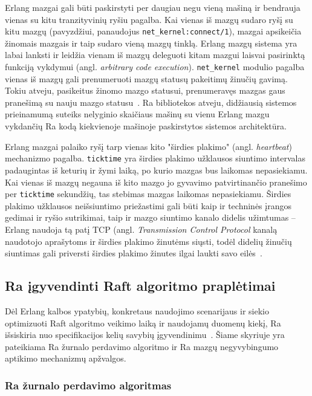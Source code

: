 \documentclass{VUMIFPSkursinis}
\begin{document}
Erlang mazgai gali būti paskirstyti per daugiau negu vieną mašiną ir bendrauja vienas su kitu tranzityvinių ryšiu pagalba. Kai vienas iš mazgų sudaro ryšį su kitu mazgų (pavyzdžiui, panaudojus \texttt{net\_kernel:connect/1}), mazgai apsikeičia žinomais mazgais ir taip sudaro vieną mazgų tinklą. Erlang mazgų sistema yra labai lanksti ir leidžia vienam iš mazgų deleguoti kitam mazgui laisvai pasirinktą funkciją vykdymui (angl. \textit{arbitrary code execution}). \texttt{net\_kernel} modulio pagalba vienas iš mazgų gali prenumeruoti mazgų statusų pakeitimų žinučių gavimą. Tokiu atveju, pasikeitus žinomo mazgo statusui, prenumeravęs mazgas gaus pranešimą su nauju mazgo statusu~\cite{erlang_distributed, hebert_learn_2013}. Ra bibliotekos atveju, didžiausią sistemos prieinamumą suteiks nelyginio skaičiaus mašinų su vienu Erlang mazgu vykdančių Ra kodą kiekvienoje mašinoje paskirstytos sistemos architektūra.

Erlang mazgai palaiko ryšį tarp vienas kito "širdies plakimo" (angl. \emph{heartbeat}) mechanizmo pagalba. \texttt{ticktime} yra širdies plakimo užklausos siuntimo intervalas padaugintas iš keturių ir žymi laiką, po kurio mazgas bus laikomas nepasiekiamu. Kai vienas iš mazgų negauna iš kito mazgo jo gyvavimo patvirtinančio pranešimo per \texttt{ticktime} sekundžių, tas stebimas mazgas laikomas nepasiekiamu. Širdies plakimo užklausos neišsiuntimo priežastimi gali būti kaip ir techninės įrangos gedimai ir ryšio sutrikimai, taip ir mazgo siuntimo kanalo didelis užimtumas -- Erlang naudoja tą patį TCP (angl. \emph{Transmission Control Protocol} kanalą naudotojo aprašytoms ir širdies plakimo žinutėms siųsti, todėl didelių žinučių siuntimas gali priversti širdies plakimo žinutes ilgai laukti savo eilės~\cite{hebert_learn_2013}.

\subsection{Ra įgyvendinti Raft algoritmo praplėtimai}

Dėl Erlang kalbos ypatybių, konkretaus naudojimo scenarijaus ir siekio optimizuoti Raft algoritmo veikimo laiką ir naudojamų duomenų kiekį, Ra išsiskiria nuo specifikacijos kelių savybių įgyvendinimu~\cite{rabbitmqra}. Šiame skyriuje yra pateikiama Ra žurnalo perdavimo algoritmo ir Ra mazgų negyvybingumo aptikimo mechanizmų apžvalgos. 

\subsubsection{Ra žurnalo perdavimo algoritmas}
\end{document}
